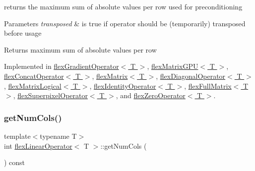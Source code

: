 returns the maximum sum of absolute values per row used for preconditioning 


\begin{DoxyParams}{Parameters}
{\em transposed} & is true if operator should be (temporarily) transposed before usage \\
\hline
\end{DoxyParams}
\begin{DoxyReturn}{Returns}
maximum sum of absolute values per row 
\end{DoxyReturn}


Implemented in \hyperlink{classflex_gradient_operator_a6acb61ea8abf404d63be4574976391bb}{flex\+Gradient\+Operator$<$ T $>$}, \hyperlink{classflex_matrix_g_p_u_aae4f81a403b6fff8ac73ccdf6c21399f}{flex\+Matrix\+G\+P\+U$<$ T $>$}, \hyperlink{classflex_concat_operator_a39b7aa1797025fb022630a63358a4072}{flex\+Concat\+Operator$<$ T $>$}, \hyperlink{classflex_matrix_a25cd9571e7056c4ad035a44a57e1d45d}{flex\+Matrix$<$ T $>$}, \hyperlink{classflex_diagonal_operator_aa9c144ae23fbcbcdcd14cc779182896a}{flex\+Diagonal\+Operator$<$ T $>$}, \hyperlink{classflex_matrix_logical_ab35a9ebf590236184573731bb08e176d}{flex\+Matrix\+Logical$<$ T $>$}, \hyperlink{classflex_identity_operator_ac9127077af24910e90eb0239a2508306}{flex\+Identity\+Operator$<$ T $>$}, \hyperlink{classflex_full_matrix_a3ca8466b330c14b23689cb9f5507d40a}{flex\+Full\+Matrix$<$ T $>$}, \hyperlink{classflex_superpixel_operator_a83c4978b05be05c45be7d2ea58e96b44}{flex\+Superpixel\+Operator$<$ T $>$}, and \hyperlink{classflex_zero_operator_a2c7b6c1cddc5a79c4d2948855a20b3f1}{flex\+Zero\+Operator$<$ T $>$}.

\mbox{\label{classflex_linear_operator_add18da4274ec9105f7ba8852be35201a}} 
\subsubsection{\texorpdfstring{get\+Num\+Cols()}{getNumCols()}}
{\footnotesize\ttfamily template$<$typename T$>$ \\
int \hyperlink{classflex_linear_operator}{flex\+Linear\+Operator}$<$ T $>$\+::get\+Num\+Cols (\begin{DoxyParamCaption}{ }\end{DoxyParamCaption}) const\hspace{0.3cm}{\ttfamily [inline]}}



